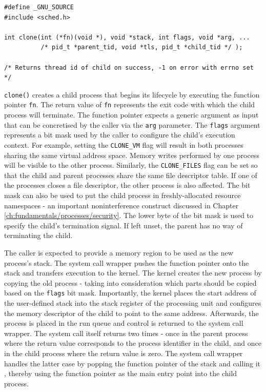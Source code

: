 \begin{lstlisting}[style=syscalls, caption={Clone System Call Wrapper}]
#define _GNU_SOURCE
#include <sched.h>

int clone(int (*fn)(void *), void *stack, int flags, void *arg, ...
          /* pid_t *parent_tid, void *tls, pid_t *child_tid */ );

/* Returns thread id of child on success, -1 on error with errno set */

\end{lstlisting}
\verb|clone()| creates a child process that begins its lifecycle by executing 
the function pointer \verb|fn|. The return value of \verb|fn| represents the exit code with which 
the child process will terminate. The function pointer expects a generic argument 
as input that can be concretised by the caller via the \verb|arg| parameter.
The \verb|flags| argument represents a bit mask used by the caller to configure 
the child's execution context. For example, setting the \verb|CLONE_VM| flag will result in 
both processes sharing the same virtual address space. Memory writes performed by one process will 
be visible to the other process. Similarly, the \verb|CLONE_FILES| flag can be set so that 
the child and parent processes share the same file descriptor table. If one of the processes 
closes a file descriptor, the other process is also affected. The bit mask can also be used 
to put the child process in freshly-allocated resource namespaces - an important noninterference construct 
discussed in Chapter \ref{ch:fundamentals/processes/security}. The lower byte of the bit mask 
is used to specify the child's termination signal. If left unset, the parent has no way 
of terminating the child.

The caller is expected to provide a memory region to be used as the new process's stack. 
The system call wrapper pushes the function pointer onto the stack and transfers execution 
to the kernel. The kernel creates the new process by copying the old process - taking into consideration 
which parts should be copied based on the \verb|flags| bit mask. Importantly, the kernel places 
the start address of the user-defined stack into the stack register of the processing unit and configures 
the memory descriptor of the child to point to the same address.
Afterwards, the process is placed in the run queue and control is returned to the system call wrapper.
The system call itself returns two times - once in the parent process where the return value corresponds 
to the process identifier in the child, and once in the child process where the return value is zero. 
The system call wrapper handles the latter case by popping the function pointer of the stack 
and calling it \cite{aarch64/clone.S}, thereby using the function pointer as the main entry point 
into the child process.

